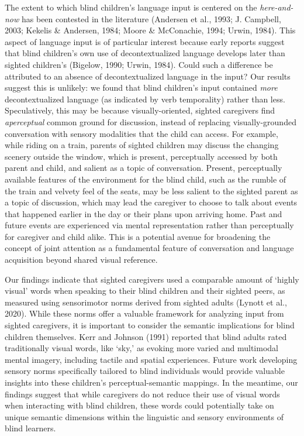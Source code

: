 \documentclass[
  man,floatsintext]{apa6}
\begin{document}
The extent to which blind children's language input is centered on the \emph{here-and-now} has been contested in the literature (Andersen et al., 1993; J. Campbell, 2003; Kekelis \& Andersen, 1984; Moore \& McConachie, 1994; Urwin, 1984). This aspect of language input is of particular interest because early reports suggest that blind children's own use of decontextualized language develops later than sighted children's (Bigelow, 1990; Urwin, 1984). Could such a difference be attributed to an absence of decontextualized language in the input? Our results suggest this is unlikely: we found that blind children's input contained \emph{more} decontextualized language (as indicated by verb temporality) rather than less. Speculatively, this may be because visually-oriented, sighted caregivers find \emph{aperceptual} common ground for discussion, instead of replacing visually-grounded conversation with sensory modalities that the child can access. For example, while riding on a train, parents of sighted children may discuss the changing scenery outside the window, which is present, perceptually accessed by both parent and child, and salient as a topic of conversation. Present, perceptually available features of the environment for the blind child, such as the rumble of the train and velvety feel of the seats, may be less salient to the sighted parent as a topic of discussion, which may lead the caregiver to choose to talk about events that happened earlier in the day or their plans upon arriving home. Past and future events are experienced via mental representation rather than perceptually for caregiver and child alike. This is a potential avenue for broadening the concept of joint attention as a fundamental feature of conversation and language acquisition beyond shared visual reference.

Our findings indicate that sighted caregivers used a comparable amount of `highly visual' words when speaking to their blind children and their sighted peers, as measured using sensorimotor norms derived from sighted adults (Lynott et al., 2020). While these norms offer a valuable framework for analyzing input from sighted caregivers, it is important to consider the semantic implications for blind children themselves. Kerr and Johnson (1991) reported that blind adults rated traditionally visual words, like `sky,' as evoking more varied and multimodal mental imagery, including tactile and spatial experiences. Future work developing sensory norms specifically tailored to blind individuals would provide valuable insights into these children's perceptual-semantic mappings. In the meantime, our findings suggest that while caregivers do not reduce their use of visual words when interacting with blind children, these words could potentially take on unique semantic dimensions within the linguistic and sensory environments of blind learners.
\end{document}
